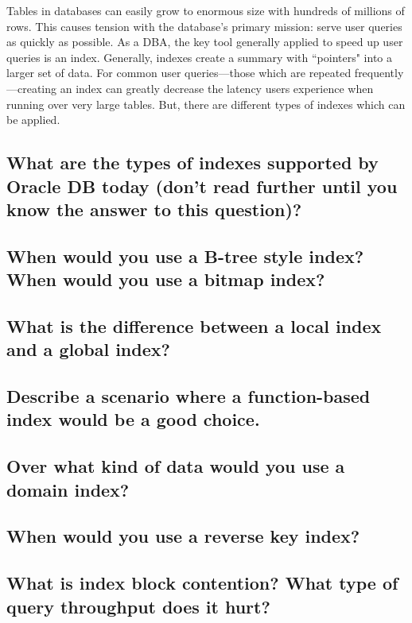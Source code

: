 \documentclass[12pt]{article}
\begin{document}
Tables in databases can easily grow to enormous size with hundreds of millions
of rows.  This causes tension with the database's primary mission: serve user
queries as quickly as possible.  As a DBA, the key tool generally applied to
speed up user queries is an index.  Generally, indexes create a summary with
``pointers" into a larger set of data.  For common user queries---those which
are repeated frequently---creating an index can greatly decrease the latency
users experience when running over very large tables.  But, there are different
types of indexes which can be applied.

\subsection{What are the types of indexes supported by Oracle DB today (don't
read further until you know the answer to this question)?}

\subsection{When would you use a B-tree style index?  When would you use a
bitmap index?}

\subsection{What is the difference between a local index and a global index?}

\subsection{Describe a scenario where a function-based index would be a good
choice.}

\subsection{Over what kind of data would you use a domain index?}

\subsection{When would you use a reverse key index?}

\subsection{What is index block contention? What type of query throughput does
it hurt?}
\end{document}
